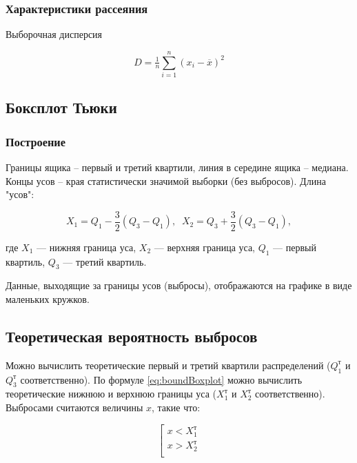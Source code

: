 \subsubsection{Характеристики рассеяния}

Выборочная дисперсия

\begin{equation}
	D = \tfrac{1}{n}\sum\limits_{i=1}^{n} (x_i - \overline{x})^2
\end{equation}

\subsection{Боксплот Тьюки}

\subsubsection{Построение}

Границы ящика -- первый и третий квартили, линия в середине ящика -- медиана. Концы усов -- края статистически значимой выборки (без выбросов). Длина "усов": 

\begin{equation} \label{eq:boundBoxplot}
	X_1 = Q_1 - \dfrac{3}{2}(Q_3 - Q_1), \;\; X_2 = Q_3 + \dfrac{3}{2}(Q_3 - Q_1),
\end{equation}

где $X_1$ --- нижняя граница уса, $X_2$ --- верхняя граница уса, $Q_1$ --- первый квартиль, $Q_3$ --- третий квартиль.

Данные, выходящие за границы усов (выбросы), отображаются на графике в виде маленьких кружков.\cite{s:boxplot}

\subsection{Теоретическая вероятность выбросов}

Можно вычислить теоретические первый и третий квартили распределений ($Q_1^\text{т}$ и $Q_3^\text{т}$ соответственно). По формуле \eqref{eq:boundBoxplot} можно вычислить теоретические нижнюю и верхнюю границы уса ($X_1^\text{т}$ и $X_2^\text{т}$ соответственно). Выбросами считаются величины $x$, такие что:

\begin{equation}
	\left[ 
	\begin{gathered} 
		x < X_1^\text{т}\\ 
		x > X_2^\text{т}\\ 
	\end{gathered} 
	\right.
\end{equation}

